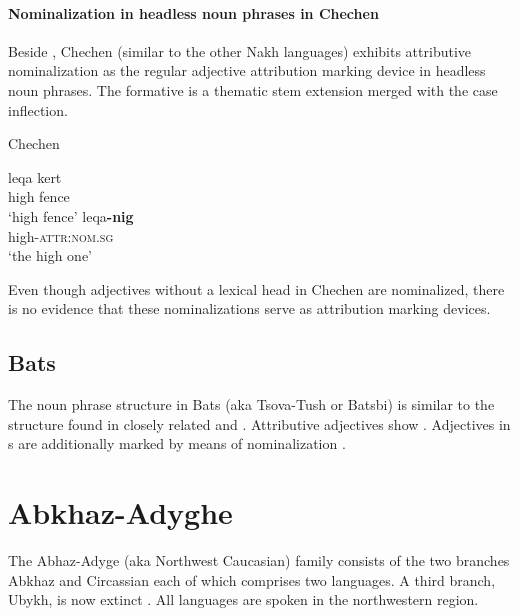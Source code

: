 \paragraph*{Nominalization in headless noun phrases in Chechen}
Beside , Chechen (similar to the other Nakh languages) exhibits attributive nominalization as the regular adjective attribution marking device in headless noun phrases. The formative is a thematic stem extension merged with the case inflection.
\begin{exe}
\ex \rm{Chechen \citep[29]{nichols1994a}}
\begin{xlist}
\ex
\gll	leqa kert\\
	high fence\\
\glt	‘high fence’
\ex	
\gll	leqa\textbf{-nig}\\
	high-\textsc{attr:nom.sg}\\
\glt	‘the high one’
\end{xlist}
\end{exe}
Even though adjectives without a lexical head in Chechen are nominalized, there is no evidence that these nominalizations serve as attribution marking devices.

\subsection{Bats}
The noun phrase structure in Bats (aka Tsova-Tush or Batsbi) is similar to the structure found in closely related  and . Attributive adjectives show . Adjectives in s are additionally marked by means of nominalization \cite[172–172]{holisky-etal1994}.

\section{Abkhaz-Adyghe}
The Abhaz-Adyge (aka Northwest Caucasian) family consists of the two branches Abkhaz and Circassian each of which comprises two languages. A third branch, Ubykh, is now extinct \citep[220, 233]{salminen2007}. All languages are spoken in the northwestern  region.

